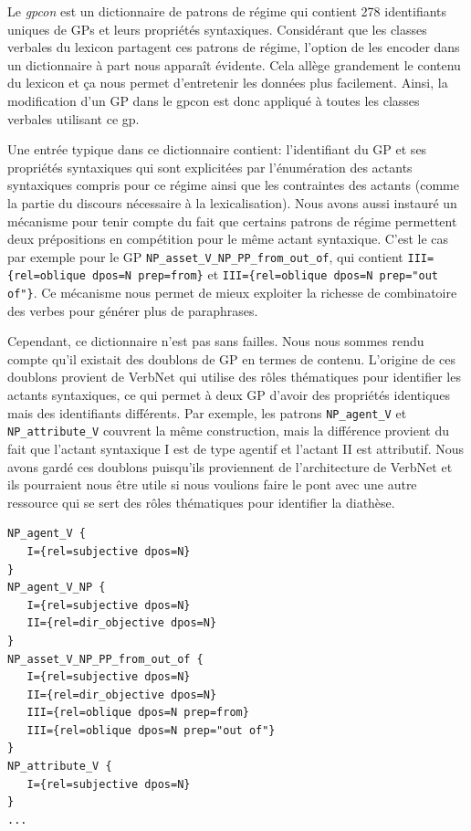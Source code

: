 Le \emph{gpcon} est un dictionnaire de patrons de régime qui contient 278 identifiants uniques de \acp{GP} et leurs propriétés syntaxiques. Considérant que les classes verbales du lexicon partagent ces patrons de régime, l'option de les encoder dans un dictionnaire à part nous apparaît évidente. Cela allège grandement le contenu du lexicon et ça nous permet d'entretenir les données plus facilement. Ainsi, la modification d'un \ac{GP} dans le gpcon est donc appliqué à toutes les classes verbales utilisant ce gp. 

Une entrée typique dans ce dictionnaire contient: l'identifiant du \ac{GP} et ses propriétés syntaxiques qui sont explicitées par l'énumération des actants syntaxiques compris pour ce régime ainsi que les contraintes des actants (comme la partie du discours nécessaire à la lexicalisation). Nous avons aussi instauré un mécanisme pour tenir compte du fait que certains patrons de régime permettent deux prépositions en compétition pour le même actant syntaxique. C'est le cas par exemple pour le \ac{GP} \texttt{NP\_asset\_V\_NP\_PP\_from\_out\_of}, qui contient \lstinline|III={rel=oblique dpos=N prep=from}| et \lstinline|III={rel=oblique dpos=N prep="out of"}|. Ce mécanisme nous permet de mieux exploiter la richesse de combinatoire des verbes pour générer plus de paraphrases.

Cependant, ce dictionnaire n'est pas sans failles. Nous nous sommes rendu compte qu'il existait des doublons de \ac{GP} en termes de contenu. L'origine de ces doublons provient de VerbNet qui utilise des rôles thématiques pour identifier les actants syntaxiques, ce qui permet à deux \ac{GP} d'avoir des propriétés identiques mais des identifiants différents. Par exemple, les patrons \texttt{NP\_agent\_V} et \texttt{NP\_attribute\_V} couvrent la même construction, mais la différence provient du fait que l'actant syntaxique I est de type agentif et l'actant II est attributif. Nous avons gardé ces doublons puisqu'ils proviennent de l'architecture de VerbNet et ils pourraient nous être utile si nous voulions faire le pont avec une autre ressource qui se sert des rôles thématiques pour identifier la diathèse.

\begin{lstlisting}[language=mate, caption = Extrait du \emph{gpcon}]
NP_agent_V {
   I={rel=subjective dpos=N}
}
NP_agent_V_NP {
   I={rel=subjective dpos=N}
   II={rel=dir_objective dpos=N}
}
NP_asset_V_NP_PP_from_out_of {
   I={rel=subjective dpos=N}
   II={rel=dir_objective dpos=N}
   III={rel=oblique dpos=N prep=from}
   III={rel=oblique dpos=N prep="out of"}
}
NP_attribute_V {
   I={rel=subjective dpos=N}
}
...
\end{lstlisting}

